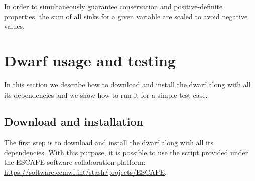 \documentclass[
a4paper,     %
12pt,        %
article,
onecolumn,   %
openany,     %
]{memoir}
\begin{document}
In order to simultaneously guarantee conservation and
positive-definite properties, the sum of all sinks for 
a given variable are scaled to avoid negative values. 



\section{Dwarf usage and testing}
In this section we describe how to download and install 
the dwarf along with all its dependencies and we show 
how to run it for a simple test case.



\subsection{Download and installation}
The first step is to download and install the dwarf along 
with all its dependencies. With this purpose, it is possible 
to use the script provided under the ESCAPE software collaboration 
platform:\\
\url{https://software.ecmwf.int/stash/projects/ESCAPE}.
\end{document}
